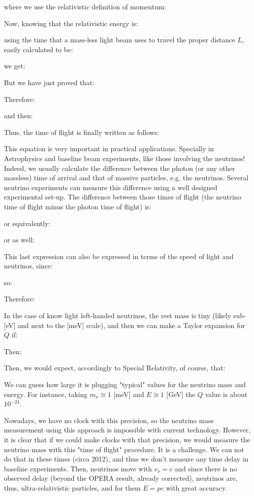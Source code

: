  	where we use the relativistic definition of momentum:
	
	Now, knowing that the relativistic energy is:
	
	using the time that a mass-less light beam uses to travel the proper distance $L$, easily calculated to be:
	
	 we get:
 	
	But we have just proved that:
	
 	Therefore:
 	
	and then:
 	
	Thus, the time of flight is finally written as follows:
 	
	This equation is very important in practical applications. Specially in Astrophysics and baseline beam experiments, like those involving the neutrinos! Indeed, we usually calculate the difference between the photon (or any other massless) time of arrival and that of massive particles, e.g. the neutrinos. Several neutrino experiments can measure this difference using a well designed experimental set-up. The difference between those times of flight (the neutrino time of flight minus the photon time of flight) is:
	
	or equivalently:
 	
	or as well:
 	
	This last expression can also be expressed in terms of the speed of light and neutrinos, since:
	
	so:
	
 	Therefore:
 	
	In the case of know light left-handed neutrinos, the rest mass is tiny (likely sub-[eV] and next to the [meV] scale), and then we can make a Taylor expansion for $Q$ if:
 	
	Then:
	
	Then, we would expect, accordingly to Special Relativity, of course, that:
	
 	We can guess how large it is plugging "typical" values for the neutrino mass and energy. For instance, taking $m_\nu\cong 1$ [meV] and $E\cong 1$ [GeV]  the $Q$ value is about $10^{-24}$.
 
	Nowadays, we have no clock with this precision, so the neutrino mass measurement using this approach is impossible with current technology. However, it is clear that if we could make clocks with that precision, we would measure the neutrino mass with this "time of flight" procedure. It is a challenge. We can not do that in these times (circa 2012), and thus we don't measure any time delay in baseline experiments. Then, neutrinos move with $v_\nu=c$ and since there is no observed delay (beyond the OPERA result, already corrected), neutrinos are, thus, ultra-relativistic particles, and for them $E=pc$ with great accuracy.
	
